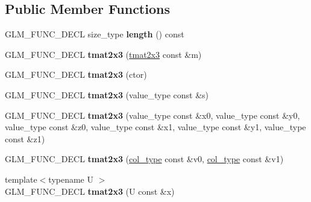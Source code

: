 \subsection*{\-Public \-Member \-Functions}
\begin{DoxyCompactItemize}
\item 
\hypertarget{structglm_1_1detail_1_1tmat2x3_a2cf87ad36165e0ec04af3b384c4c6551}{\-G\-L\-M\-\_\-\-F\-U\-N\-C\-\_\-\-D\-E\-C\-L size\-\_\-type {\bfseries length} () const }\label{structglm_1_1detail_1_1tmat2x3_a2cf87ad36165e0ec04af3b384c4c6551}

\item 
\hypertarget{structglm_1_1detail_1_1tmat2x3_a882c554a039fb6f05295d25230876408}{\-G\-L\-M\-\_\-\-F\-U\-N\-C\-\_\-\-D\-E\-C\-L {\bfseries tmat2x3} (\hyperlink{structglm_1_1detail_1_1tmat2x3}{tmat2x3} const \&m)}\label{structglm_1_1detail_1_1tmat2x3_a882c554a039fb6f05295d25230876408}

\item 
\hypertarget{structglm_1_1detail_1_1tmat2x3_a55e83395bf56965a48cd4604b4644cab}{\-G\-L\-M\-\_\-\-F\-U\-N\-C\-\_\-\-D\-E\-C\-L {\bfseries tmat2x3} (ctor)}\label{structglm_1_1detail_1_1tmat2x3_a55e83395bf56965a48cd4604b4644cab}

\item 
\hypertarget{structglm_1_1detail_1_1tmat2x3_abf51ec12b9ea2ee650ef0cd4854a85cc}{\-G\-L\-M\-\_\-\-F\-U\-N\-C\-\_\-\-D\-E\-C\-L {\bfseries tmat2x3} (value\-\_\-type const \&s)}\label{structglm_1_1detail_1_1tmat2x3_abf51ec12b9ea2ee650ef0cd4854a85cc}

\item 
\hypertarget{structglm_1_1detail_1_1tmat2x3_a723c041ca01d0846e7ac1e2cf94fa388}{\-G\-L\-M\-\_\-\-F\-U\-N\-C\-\_\-\-D\-E\-C\-L {\bfseries tmat2x3} (value\-\_\-type const \&x0, value\-\_\-type const \&y0, value\-\_\-type const \&z0, value\-\_\-type const \&x1, value\-\_\-type const \&y1, value\-\_\-type const \&z1)}\label{structglm_1_1detail_1_1tmat2x3_a723c041ca01d0846e7ac1e2cf94fa388}

\item 
\hypertarget{structglm_1_1detail_1_1tmat2x3_a6219dd710c9dc7a235745543995c2034}{\-G\-L\-M\-\_\-\-F\-U\-N\-C\-\_\-\-D\-E\-C\-L {\bfseries tmat2x3} (\hyperlink{structglm_1_1detail_1_1tvec3}{col\-\_\-type} const \&v0, \hyperlink{structglm_1_1detail_1_1tvec3}{col\-\_\-type} const \&v1)}\label{structglm_1_1detail_1_1tmat2x3_a6219dd710c9dc7a235745543995c2034}

\item 
\hypertarget{structglm_1_1detail_1_1tmat2x3_ad5c1b77b2c1b21348f3fc31b9efd62b5}{{\footnotesize template$<$typename U $>$ }\\\-G\-L\-M\-\_\-\-F\-U\-N\-C\-\_\-\-D\-E\-C\-L {\bfseries tmat2x3} (\-U const \&x)}\label{structglm_1_1detail_1_1tmat2x3_ad5c1b77b2c1b21348f3fc31b9efd62b5}


\end{DoxyCompactItemize}
